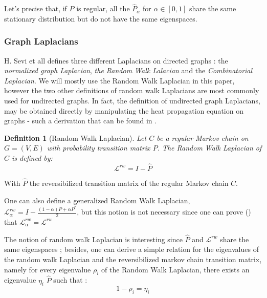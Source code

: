 \documentclass{article}
\newtheorem{definition}{Definition}[section]
\begin{document}
Let's precise that, if $P$ is regular, all the $\hat{P}_\alpha$ for $\alpha \in [0,1]$ share the same stationary distribution but do not have the same eigenspaces.

\subsubsection{Graph Laplacians}

H. Sevi et all \cite{sevi2019} defines three different Laplacians on directed graphs : the \textit{normalized graph Laplacian}, \textit{the Random Walk Lalacian} and the \textit{Combinatorial Laplacian}. We will mostly use the Random Walk Laplacian in this paper, however the two other definitions of random walk Laplacians are most commonly used for undirected graphs. In fact, the definition of undirected graph Laplacians, may be obtained directly by manipulating the heat propagation equation on graphs - such a derivation that can be found in \cite{ricaud_borgnat_tremblay_gonçalves_vandergheynst_2019}.

\begin{definition}[Random Walk Laplacian]
Let $C$ be a regular Markov chain on $G=(V,E)$ with probability transition matrix $P$. The Random Walk Laplacian of $C$ is defined by:
\begin{equation}
    \mathcal{L}^{rw} = I - \hat{P}
\end{equation}

\end{definition}

With $\hat{P}$ the reversibilized transition matrix of the regular Markov chain $C$.

One can also define a generalized Random Walk Laplacian, $\mathcal{L}^{rw}_\alpha = I - \frac{(1-\alpha)P + \alpha P^* }{2}$, but this notion is not necessary since one can prove (\cite{sevi2019}) that $\mathcal{L}^{rw}_\alpha = \mathcal{L}^{rw}$

The notion of random walk Laplacian is interesting since $\hat{P}$ and $\mathcal{L}^{rw}$ share the same eigenspaces ; besides, one can derive a simple relation for the eigenvalues of the random walk Laplacian and the reversibilized markov chain transition matrix, namely for every eigenvalue $\rho_i$ of the Random Walk Laplacian, there exists an eigenvalue $\eta_i$ $\hat{P}$ such that :
\begin{equation}\label{eq:relation_laplacian_eigenvalues}
    1-\rho_i = \eta_i
\end{equation}
\end{document}

